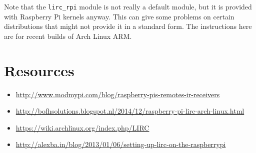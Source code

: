 \documentclass{article}
\begin{document}
Note that the {\tt lirc\_rpi} module is not really a default module, but it is 
provided with Raspberry Pi kernels anyway. This can give some problems on 
certain distributions that might not provide it in a standard form. The 
instructions here are for recent builds of Arch Linux ARM\@.

\section{Resources}
\begin{itemize}
    \item \url{http://www.modmypi.com/blog/raspberry-pis-remotes-ir-receivers}
    \item 
        \url{http://bofhsolutions.blogspot.nl/2014/12/raspberry-pi-lirc-arch-linux.html}
    \item \url{https://wiki.archlinux.org/index.php/LIRC}
    \item 
        \url{http://alexba.in/blog/2013/01/06/setting-up-lirc-on-the-raspberrypi}
\end{itemize}
\end{document}
